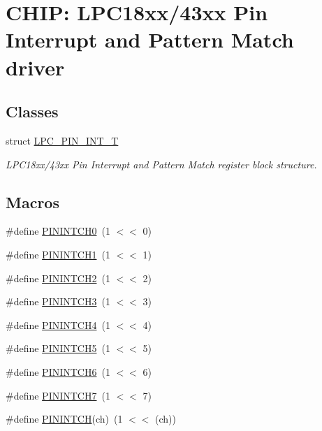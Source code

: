 \hypertarget{group___p_i_n_i_n_t__18_x_x__43_x_x}{}\section{C\+H\+IP\+: L\+P\+C18xx/43xx Pin Interrupt and Pattern Match driver}
\label{group___p_i_n_i_n_t__18_x_x__43_x_x}
\subsection*{Classes}
\begin{DoxyCompactItemize}
\item 
struct \hyperlink{struct_l_p_c___p_i_n___i_n_t___t}{L\+P\+C\+\_\+\+P\+I\+N\+\_\+\+I\+N\+T\+\_\+T}
\begin{DoxyCompactList}\small\item\em L\+P\+C18xx/43xx Pin Interrupt and Pattern Match register block structure. \end{DoxyCompactList}\end{DoxyCompactItemize}
\subsection*{Macros}
\begin{DoxyCompactItemize}
\item 
\#define \hyperlink{group___p_i_n_i_n_t__18_x_x__43_x_x_gaba419aacec8ac614ec6d121e05bf79cd}{P\+I\+N\+I\+N\+T\+C\+H0}~(1 $<$$<$ 0)
\item 
\#define \hyperlink{group___p_i_n_i_n_t__18_x_x__43_x_x_gae8f33cd2dabaa92a5e3dd4d8dbe5f6ed}{P\+I\+N\+I\+N\+T\+C\+H1}~(1 $<$$<$ 1)
\item 
\#define \hyperlink{group___p_i_n_i_n_t__18_x_x__43_x_x_gaabd4245998a4e0c9ee040916b8b5c62f}{P\+I\+N\+I\+N\+T\+C\+H2}~(1 $<$$<$ 2)
\item 
\#define \hyperlink{group___p_i_n_i_n_t__18_x_x__43_x_x_ga83ffe2314036836a570861fdfb983e75}{P\+I\+N\+I\+N\+T\+C\+H3}~(1 $<$$<$ 3)
\item 
\#define \hyperlink{group___p_i_n_i_n_t__18_x_x__43_x_x_gaeff8dc2ad86edbabd3b871c3c0676e9b}{P\+I\+N\+I\+N\+T\+C\+H4}~(1 $<$$<$ 4)
\item 
\#define \hyperlink{group___p_i_n_i_n_t__18_x_x__43_x_x_ga39cebaf09c7a9f77d607dbf344c53f82}{P\+I\+N\+I\+N\+T\+C\+H5}~(1 $<$$<$ 5)
\item 
\#define \hyperlink{group___p_i_n_i_n_t__18_x_x__43_x_x_gac067933ca09f529b57e1f6c9f55109ca}{P\+I\+N\+I\+N\+T\+C\+H6}~(1 $<$$<$ 6)
\item 
\#define \hyperlink{group___p_i_n_i_n_t__18_x_x__43_x_x_ga0f3c2aeafda4746d1c275164fd5dc832}{P\+I\+N\+I\+N\+T\+C\+H7}~(1 $<$$<$ 7)
\item 
\#define \hyperlink{group___p_i_n_i_n_t__18_x_x__43_x_x_ga8d78afc0f4b847de15629e9cd297fd72}{P\+I\+N\+I\+N\+T\+CH}(ch)~(1 $<$$<$ (ch))
\end{DoxyCompactItemize}
